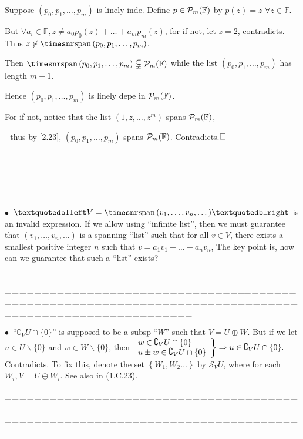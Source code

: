 \documentclass[a4paper, 11pt, UTF8]{article}
\def\Spn{{\timesnr\textup{span}}\,}
\def\Fbb{{\mathbb{F}}}
\def\BulletPoint{{\small$\bullet$}}
\def\ProblemEnding{{\tiny \_\,\_\,\_\,\_\,\_\,\_\,\_\,\_\,\_\,\_\,\_\,\_\,\_\,\_\,\_\,\_\,\_\,\_\,\_\,\_\,\_\,\_\,\_\,\_\,\_\,\_\,\_\,\_\,\_\,\_\,\_\,\_\,\_\,\_\,\_\,\_\,\_\,\_\,\_\,\_\,\_\,\_\,\_\,\_\,\_\,\_\,\_\,\_\,\_\,\_\,\_\,\_\,\_\,\_\,\_\,\_\,\_\,\_\,\_\,\_\,\_\,\_\,\_\,\_\,\_\,\_\,\_\,\_\,\_\,\_\,\_\_\,\_\,\_\,\_\,\_\,\_\,\_\,\_\,\_\,\_\,\_\,\_\,\_\,\_\,\_\,\_\,\_\,\_\,\_\,\_\,\_\,\_\,\_\,\_\,\_\,\_\,\_\,\_\,\_\,\_\,\_\,\_\,\_\,\_\,\_\,\_\,\_\,\_\,\_\,\_\,\_\,\_\,\_\,\_\,\_\,\_\,\_\,\_\,\_\,\_\,\_\,\_\,\_\,\_\,\_\,\_\,\_\,\_\,\_\,\_\,\_\,\_\,\_\,\_\,\_\,\_\,\_\,\_\,\_\,\_\,\_}}
\def\ChapterEnding{\rightline{\timesbfx\Large{E{\small NDED}}}\par\vspace{6pt}}
\begin{document}
\begin{large}
\par\quad
Suppose $(p_0,p_1,\dots,p_m)$ is linely inde. Define $p\in\PoF{m}$ by $p(z)=z\,\,\forall z\in\Fbb.$\par\quad
But $\forall a_i\in\Fbb,z\neq a_0 p_0(z)+\dots+a_m p_m(z)$, for if not, let $z=2$, contradicts.
Thus $z\not\in\Spn(p_0,p_1,\dots,p_m)$.\par\quad
Then $\Spn(p_0,p_1,\dots,p_m)\subsetneqq\PoF{m}$ while the list $(p_0,p_1,\dots,p_m)$ has length $m+1$.\par\quad
Hence $(p_0,p_1,\dots,p_m)$ is linely depe in $\PoF{m}$.\par\quad
For if not, notice that the list $(1,z,\dots,z^m)$ spans $\PoF{m}$,\par\qquad\qquad\quad\,\,
thus by [2.23], $(p_0,p_1,\dots,p_m)$ spans $\PoF{m}$. Contradicts.$\hfill\square$\par
\ProblemEnding\par

\ChapterEnding


\BulletPoint \,\hspace{1pt}\TextB{}
$“V=\Spn(v_1,\dots,v_n,\dots)”$ is an invalid expression.\TextB{}
If we allow using $“$infinite list$”$, then we must guarantee that $(v_1,\dots,v_n,\dots)$ is a spanning $“$list$”$\TextB{}
such that for all $v\in V$, there exists a smallest positive integer $n$ such that $v=a_1 v_1+\dots+a_n v_n$,\TextB{}
The key point is, how can we guarantee that such a $“$list$”$ exists?\par
\ProblemEnding\par

\BulletPoint \,\hspace{1pt}
$“\complement_V U \cap \{0\}”$ is supposed to be a subsp $“W”$ such that $V=U\oplus W$.\TextB{}
But if we let $u\in U\backslash\{0\}$ and $w\in W\backslash\{0\}$, then $\MathRightBrace{l}{w\in\complement_V U \cap \{0\}\\ u\pm w\in\complement_V U \cap \{0\} }\Rightarrow u\in\complement_V U \cap \{0\}.$ Contradicts.\TextB{}
To fix this, {\Large denote the set $\left\{W_1,W_2\dots\right\}$ by $\mathcal{S}_V U$,} {\small where for each $W_i,V=U\oplus W_i$. See also in (1.C.23).}\par\ProblemEnding\par


\end{large}
\end{document}
